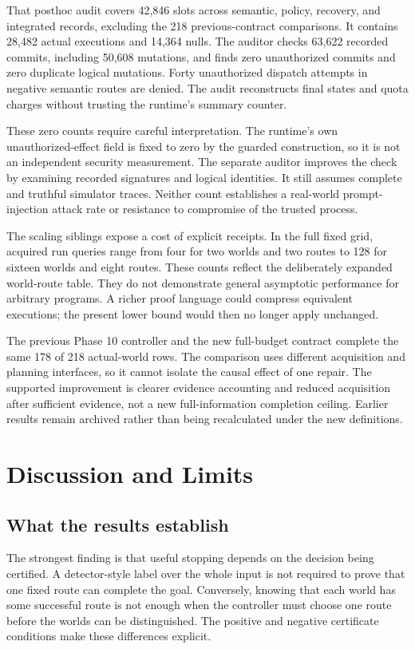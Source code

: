 \documentclass[conference]{IEEEtran}
\begin{document}
That posthoc audit covers 42,846 slots across semantic, policy, recovery, and integrated records, excluding the 218 previous-contract comparisons. It contains 28,482 actual executions and 14,364 nulls. The auditor checks 63,622 recorded commits, including 50,608 mutations, and finds zero unauthorized commits and zero duplicate logical mutations. Forty unauthorized dispatch attempts in negative semantic routes are denied. The audit reconstructs final states and quota charges without trusting the runtime's summary counter.

These zero counts require careful interpretation. The runtime's own unauthorized-effect field is fixed to zero by the guarded construction, so it is not an independent security measurement. The separate auditor improves the check by examining recorded signatures and logical identities. It still assumes complete and truthful simulator traces. Neither count establishes a real-world prompt-injection attack rate or resistance to compromise of the trusted process.

The scaling siblings expose a cost of explicit receipts. In the full fixed grid, acquired run queries range from four for two worlds and two routes to 128 for sixteen worlds and eight routes. These counts reflect the deliberately expanded world-route table. They do not demonstrate general asymptotic performance for arbitrary programs. A richer proof language could compress equivalent executions; the present lower bound would then no longer apply unchanged.

The previous Phase 10 controller and the new full-budget contract complete the same 178 of 218 actual-world rows. The comparison uses different acquisition and planning interfaces, so it cannot isolate the causal effect of one repair. The supported improvement is clearer evidence accounting and reduced acquisition after sufficient evidence, not a new full-information completion ceiling. Earlier results remain archived rather than being recalculated under the new definitions.

\section{Discussion and Limits}
\label{sec:discussion}
\subsection{What the results establish}
The strongest finding is that useful stopping depends on the decision being certified. A detector-style label over the whole input is not required to prove that one fixed route can complete the goal. Conversely, knowing that each world has some successful route is not enough when the controller must choose one route before the worlds can be distinguished. The positive and negative certificate conditions make these differences explicit.
\end{document}
